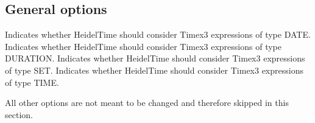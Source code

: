 \begin{itemize}
\subsection*{\textbf{General options}}
Indicates whether HeidelTime should consider Timex3 expressions of type DATE.
Indicates whether HeidelTime should consider Timex3 expressions of type DURATION.
Indicates whether HeidelTime should consider Timex3 expressions of type SET.
Indicates whether HeidelTime should consider Timex3 expressions of type TIME.
\end{itemize}
All other options are not meant to be changed and therefore skipped in this section.
